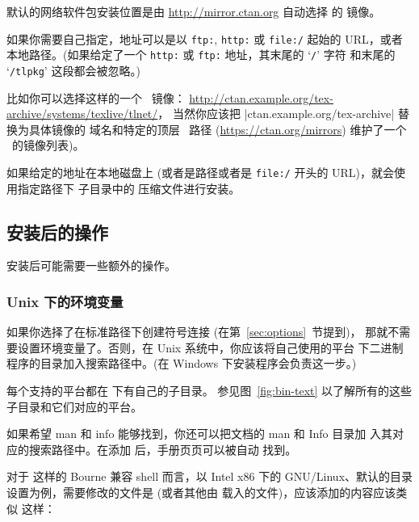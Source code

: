 \documentclass{article}
\begin{document}
默认的网络软件包安装位置是由 \url{http://mirror.ctan.org} 自动选择
的 \CTAN{} 镜像。

如果你需要自己指定，地址可以是以 \texttt{ftp:}, \texttt{http:} 或
\texttt{file:/} 起始的 URL，或者本地路径。(如果给定了一个
\texttt{http:} 或 \texttt{ftp:} 地址，其末尾的 `\texttt{/}' 字符
和末尾的 `\texttt{/tlpkg}' 这段都会被忽略。)

比如你可以选择这样的一个 \CTAN\ 镜像：
\url{http://ctan.example.org/tex-archive/systems/texlive/tlnet/}，
当然你应该把 |ctan.example.org/tex-archive| 替换为具体镜像的
域名和特定的顶层 \CTAN\ 路径 (\url{https://ctan.org/mirrors})
维护了一个 \CTAN\ 的镜像列表)。

如果给定的地址在本地磁盘上 (或者是路径或者是 \texttt{file:/}
开头的 URL)，就会使用指定路径下  子目录中的
压缩文件进行安装。

\subsection{安装后的操作}
\label{sec:postinstall}

安装后可能需要一些额外的操作。

\subsubsection{Unix 下的环境变量}
\label{sec:env}

如果你选择了在标准路径下创建符号连接 (在第~\ref{sec:options}~节提到)，
那就不需要设置环境变量了。否则，在 Unix 系统中，你应该将自己使用的平台
下二进制程序的目录加入搜索路径中。(在 Windows 下安装程序会负责这一步。)

每个支持的平台都在  下有自己的子目录。
参见图~\ref{fig:bin-text} 以了解所有的这些子目录和它们对应的平台。

如果希望 man 和 info 能够找到，你还可以把文档的 man 和 Info 目录加
入其对应的搜索路径中。在添加  后，手册页页可以被自动
找到。

对于  这样的 Bourne 兼容 shell 而言，以 Intel x86 下的
GNU/Linux、默认的目录设置为例，需要修改的文件是 
(或者其他由  载入的文件)，应该添加的内容应该类似
这样：

\end{document}
